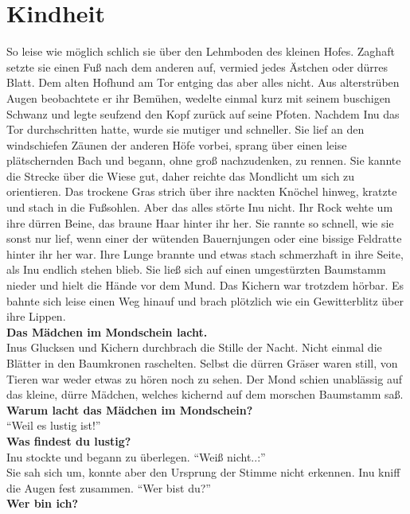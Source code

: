 \chapter{Kindheit}


So leise wie möglich schlich sie über den Lehmboden des kleinen Hofes. Zaghaft setzte sie einen 
Fuß nach dem anderen auf, vermied jedes Ästchen oder dürres Blatt. Dem alten Hofhund am Tor entging 
das aber alles nicht. Aus alterstrüben Augen beobachtete er ihr Bemühen, wedelte einmal kurz mit 
seinem buschigen Schwanz und legte seufzend den Kopf zurück auf seine Pfoten. Nachdem Inu das Tor 
durchschritten hatte, wurde sie mutiger und schneller. Sie lief an den windschiefen Zäunen der 
anderen Höfe vorbei, sprang über einen leise plätschernden Bach und begann, ohne groß nachzudenken, 
zu rennen. Sie kannte die Strecke über die Wiese gut, daher reichte das Mondlicht um sich zu 
orientieren. Das trockene Gras strich über ihre nackten Knöchel hinweg, kratzte und stach in die 
Fußsohlen. Aber das alles störte Inu nicht. Ihr Rock wehte um ihre dürren Beine, das braune Haar 
hinter ihr her. Sie rannte so schnell, wie sie sonst nur lief, wenn einer der wütenden Bauernjungen 
oder eine bissige Feldratte hinter ihr her war. Ihre Lunge brannte und etwas stach schmerzhaft in 
ihre Seite, als Inu endlich stehen blieb. Sie ließ sich auf einen umgestürzten Baumstamm nieder und 
hielt die Hände vor dem Mund. Das Kichern war trotzdem hörbar. Es bahnte sich leise einen Weg hinauf 
und brach plötzlich wie ein Gewitterblitz über ihre Lippen.\\
\textbf{Das Mädchen im Mondschein lacht.}\\
Inus Glucksen und Kichern durchbrach die Stille der Nacht. Nicht einmal die Blätter in den 
Baumkronen raschelten. Selbst die dürren Gräser waren still, von Tieren war weder etwas zu hören 
noch zu sehen. Der Mond schien unablässig auf das kleine, dürre Mädchen, welches kichernd auf dem 
morschen Baumstamm saß.\\
\textbf{Warum lacht das Mädchen im Mondschein?}\\
``Weil es lustig ist!''\\
\textbf{Was findest du lustig?}\\
Inu stockte und begann zu überlegen. ``Weiß nicht..:''\\
Sie sah sich um, konnte aber den Ursprung der Stimme nicht erkennen. Inu kniff die Augen fest 
zusammen. ``Wer bist du?''\\
\textbf{Wer bin ich?}\\
